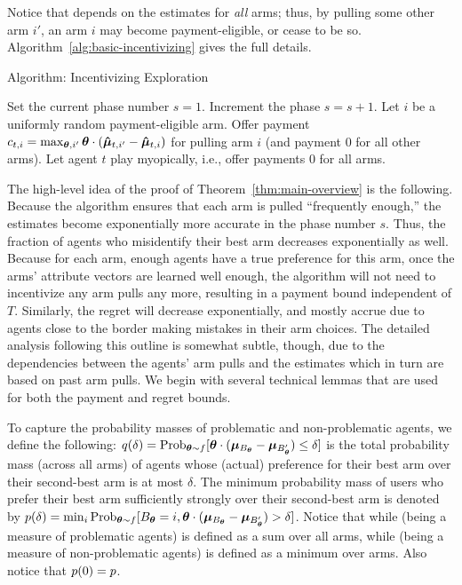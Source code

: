 Notice that  depends on the estimates for \emph{all}
arms; thus, by pulling some other arm $i'$, an arm $i$ may become
payment-eligible, or cease to be so.
Algorithm~\ref{alg:basic-incentivizing} gives the full details.


\begin{algorithm}
\caption{Algorithm: Incentivizing Exploration \label{alg:basic-incentivizing}}
\begin{algorithmic}
\STATE Set the current phase number $s = 1$.
\STATE Increment the phase $s = s + 1$.
\ENDIF
{}
\STATE Let $i$ be a uniformly random payment-eligible arm.
\STATE Offer payment
$c_{t,i} = \max_{\bm{\theta},i'} \bm{\theta} \cdot (\bm{\hat{\mu}}_{t,i'} - \bm{\hat{\mu}}_{t,i})$
for pulling arm $i$
(and payment 0 for all other arms).
\ELSE
\STATE Let agent $t$ play myopically, i.e., offer payments 0 for all arms.
\ENDIF
\ENDFOR
\end{algorithmic}
\end{algorithm}

The high-level idea of the proof of Theorem~\ref{thm:main-overview}
is the following.
Because the algorithm ensures that each arm is pulled
``frequently enough,''
the estimates  become exponentially more accurate in the
phase number $s$.
Thus, the fraction of agents who misidentify their best arm decreases
exponentially as well.
Because for each arm, enough agents have a true preference for this
arm, once the arms' attribute vectors are learned well enough,
the algorithm will not need to incentivize any arm pulls any more,
resulting in a payment bound independent of $T$.
Similarly, the regret will decrease exponentially, and mostly accrue
due to agents close to the border making mistakes in their arm choices.
The detailed analysis following this outline is somewhat subtle, though,
due to the dependencies between the agents' arm pulls and the
estimates which in turn are based on past arm pulls.
We begin with several technical lemmas that are used for both the
payment and regret bounds.

To capture the probability masses of problematic and non-problematic
agents, we define the following:
$\AlmostTied{\delta} = \Prob[\AgV \sim \AgentDist]{%
\AgV \cdot (\ArmV{\Best{\AgV}} - \ArmV{\Second{\AgV}}) \leq \delta}$
is the total probability mass (across all arms) of agents
whose (actual) preference for their best arm over their second-best
arm is at most $\delta$.
The minimum probability mass of users who prefer their best arm
sufficiently strongly over their second-best arm is denoted by
$\ClearPref{\delta} = \min_{i}
\Prob[\AgV \sim \AgentDist]{\Best{\AgV}=i,%
\AgV \cdot (\ArmV{\Best{\AgV}} - \ArmV{\Second{\AgV}}) > \delta}$.
Notice that while \AlmostTied{\delta} (being a measure of problematic
agents) is defined as a sum over all arms,
while  \ClearPref{\delta} (being a measure of non-problematic agents)
is defined as a minimum over arms.
Also notice that $p(0) = p$.


